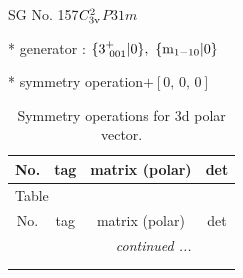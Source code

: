 \documentclass[fleqn,8pt]{jsarticle}
\begin{document}
\setcounter{MaxMatrixCols}{32}

\renewcommand{\tablename}{Table~}
\renewcommand{\figurename}{Figure~}
\begin{center}
\LARGE
SG No. 157\quad$C_{\rm 3v}^{2}$\quad$P31m$\quad[ trigonal ]
\end{center}

* generator : $\{3^{+}_{\,\,001}|0\},\,\,\{{\rm m}_{1-10}|0\}$

* symmetry operation\quad$+\left[ 0,\, 0,\, 0 \right]$
\renewcommand{\arraystretch}{1.3}
\begin{longtable}{cccc}
\caption{Symmetry operations for 3d polar vector.}
 \\
 \hline \hline
No. & tag & matrix (polar) & det \\ \hline \endfirsthead

\multicolumn{3}{l}{\tablename\ \thetable{}} \\
 \hline \hline
No. & tag & matrix (polar) & det \\ \hline \endhead

 \hline \hline
\multicolumn{3}{r}{\footnotesize\it continued ...} \\ \endfoot

 \hline \hline
\multicolumn{3}{r}{} \\ \endlastfoot


\end{longtable}
\end{document}

